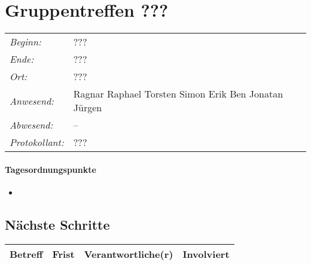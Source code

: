 \documentclass{scrartcl}
\date{???}	%
\begin{document}
\maketitle
\section{Gruppentreffen ???}	%
\begin{tabular}[t]{p{.25\linewidth} p{.25\linewidth}}
\emph{Beginn:}				& ???\\
\emph{Ende:}					& ???\\
\emph{Ort:}						& ???\\
\emph{Anwesend:}	& 
Ragnar\newline
Raphael\newline
Torsten\newline
Simon\newline
Erik\newline
Ben\newline
Jonatan\newline
Jürgen
\\
\emph{Abwesend:}		 & 
--
\\
\emph{Protokollant:}& ???
\end{tabular}
\paragraph{Tagesordnungspunkte}
\begin{itemize}
\item 
\end{itemize}

\subsection{}

\subsection{Nächste Schritte}
\begin{tabular}{L{.249} L{.2} L{.25} L{.25}}
Betreff & Frist & Verantwortliche(r) & Involviert\\\hline

\end{tabular}
\end{document}
